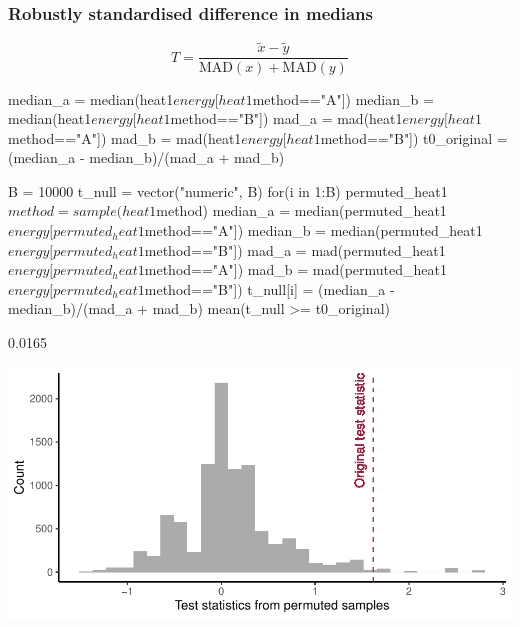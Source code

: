 \documentclass[a4paper]{article}
\begin{document}
\subsubsection{Robustly standardised difference in medians}
\[
	T = \frac{\widetilde{x} - \widetilde{y}}{\mathrm{MAD}(x) + \mathrm{MAD}(y)}
\]
\begin{Schunk}
\begin{Sinput}
median_a = median(heat1$energy[heat1$method=="A"])
median_b = median(heat1$energy[heat1$method=="B"])
mad_a = mad(heat1$energy[heat1$method=="A"])
mad_b = mad(heat1$energy[heat1$method=="B"])
t0_original = (median_a - median_b)/(mad_a + mad_b)

B = 10000
t_null = vector("numeric", B)
for(i in 1:B){
  permuted_heat1$method = sample(heat1$method)
  median_a = median(permuted_heat1$energy[permuted_heat1$method=="A"])
  median_b = median(permuted_heat1$energy[permuted_heat1$method=="B"])
  mad_a = mad(permuted_heat1$energy[permuted_heat1$method=="A"])
  mad_b = mad(permuted_heat1$energy[permuted_heat1$method=="B"])
  t_null[i] = (median_a - median_b)/(mad_a + mad_b)
}
mean(t_null >= t0_original)
\end{Sinput}
\begin{Soutput}
[1] 0.0165
\end{Soutput}
\end{Schunk}
\begin{Schunk}


{\centering \includegraphics[width=\maxwidth]{figure/listings-unnamed-chunk-160-1} 

}

\end{Schunk}
\end{document}
